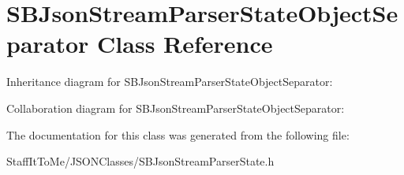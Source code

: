 \hypertarget{interface_s_b_json_stream_parser_state_object_separator}{
\section{\-S\-B\-Json\-Stream\-Parser\-State\-Object\-Separator \-Class \-Reference}
\label{interface_s_b_json_stream_parser_state_object_separator}
}


\-Inheritance diagram for \-S\-B\-Json\-Stream\-Parser\-State\-Object\-Separator\-:


\-Collaboration diagram for \-S\-B\-Json\-Stream\-Parser\-State\-Object\-Separator\-:


\-The documentation for this class was generated from the following file\-:\begin{DoxyCompactItemize}
\item 
\-Staff\-It\-To\-Me/\-J\-S\-O\-N\-Classes/\-S\-B\-Json\-Stream\-Parser\-State.\-h\end{DoxyCompactItemize}
